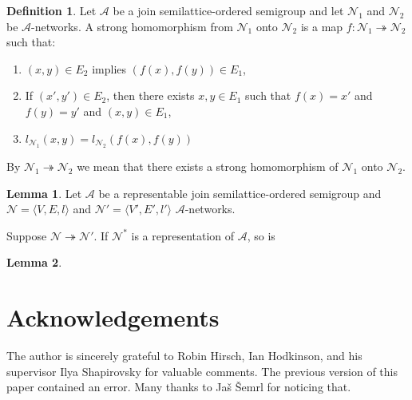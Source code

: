 \documentclass[a4paper]{article}
\theoremstyle{definition}
\newtheorem{definition}{Definition}
\theoremstyle{theorem}
\theoremstyle{proposition}
\theoremstyle{lemma}
\newtheorem{lemma}{Lemma}
\theoremstyle{ex}
\theoremstyle{corollary}
\theoremstyle{claim}
\begin{document}
\begin{definition}
  Let $\mathcal{A}$ be a join semilattice-ordered semigroup and let $\mathcal{N}_1$ and $\mathcal{N}_2$ be $\mathcal{A}$-networks. A strong homomorphism from $\mathcal{N}_1$ onto $\mathcal{N}_2$ is a map $f : \mathcal{N}_1 \twoheadrightarrow \mathcal{N}_2$ such that:
  \begin{enumerate}
    \item $(x, y) \in E_2$ implies $(f(x), f(y)) \in E_1$,
    \item If $(x', y') \in E_2$, then there exists $x, y \in E_1$ such that $f(x) = x'$ and $f(y) = y'$ and $(x, y) \in E_1$,
    \item $l_{\mathcal{N}_1}(x, y) = l_{\mathcal{N}_2}(f(x),f(y))$
  \end{enumerate}
  By $\mathcal{N}_1 \twoheadrightarrow \mathcal{N}_2$ we mean that there exists a strong homomorphism of $\mathcal{N}_1$ onto $\mathcal{N}_2$.
\end{definition}

\begin{lemma}
  Let $\mathcal{A}$ be a representable join semilattice-ordered semigroup and $\mathcal{N} = \langle V, E, l \rangle$ and $\mathcal{N}' = \langle V', E', l' \rangle$ $\mathcal{A}$-networks.

  Suppose $\mathcal{N} \twoheadrightarrow \mathcal{N}'$. If $\mathcal{N}^{*}$ is a representation of $\mathcal{A}$, so is $ $
\end{lemma}

\begin{lemma}
\end{lemma}

\section{Acknowledgements}

The author is sincerely grateful to Robin Hirsch, Ian Hodkinson, and his supervisor Ilya Shapirovsky for valuable comments. The previous version of this paper contained an error. Many thanks to Ja\v{s} \v{S}emrl for noticing that.



\end{document}

